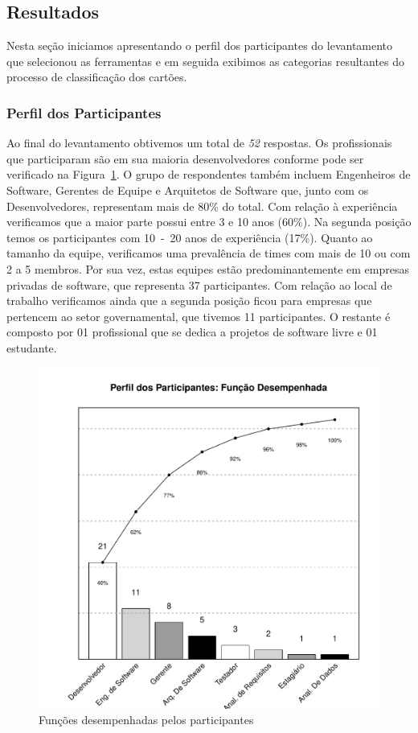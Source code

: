 \subsection{Resultados}
\label{sec:resultados}

Nesta seção iniciamos apresentando o perfil dos participantes do levantamento
que selecionou as ferramentas e em seguida exibimos as categorias resultantes do
processo de classificação dos cartões.

\subsubsection{Perfil dos Participantes}
\label{ssub:perfil_participantes}

Ao final do levantamento obtivemos um total de \textit{52} respostas. Os
profissionais que participaram são em sua maioria desenvolvedores conforme pode
ser verificado na
Figura~\ref{fig:grafico_escolha_ferramentas_funcao_participantes}. O grupo de
respondentes também incluem Engenheiros de Software, Gerentes de Equipe e
Arquitetos de Software que, junto com os Desenvolvedores, representam mais de
80\% do total. Com relação à experiência verificamos que a maior parte possui
entre 3 e 10 anos (60\%). Na segunda posição temos os participantes com 10~-~20
anos de experiência (17\%). Quanto ao tamanho da equipe, verificamos uma
prevalência de times com mais de 10 ou com 2 a 5 membros. Por sua vez, estas
equipes estão predominantemente em empresas privadas de software, que
representa 37 participantes. Com relação ao local de trabalho verificamos ainda
que a segunda posição ficou para empresas que pertencem ao setor governamental,
que tivemos 11 participantes. O restante é composto por 01 profissional que se
dedica a projetos de software livre e 01 estudante.

\begin{figure}[htpb]
	\centering
	\includegraphics[width=0.7\linewidth]{./chapter-estudo-funcionalidades-fgrm/img/grafico_escolha_ferramentas_funcao_participantes.pdf}
	\caption{Funções desempenhadas pelos participantes}
\label{fig:grafico_escolha_ferramentas_funcao_participantes}
\end{figure}

